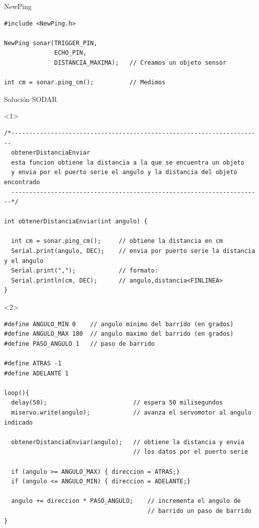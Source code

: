 \begin{frame}[fragile]{NewPing}
  \begin{lstlisting}
#include <NewPing.h>

NewPing sonar(TRIGGER_PIN,
              ECHO_PIN,
              DISTANCIA_MAXIMA);   // Creamos un objeto sensor

int cm = sonar.ping_cm();          // Medimos
  \end{lstlisting}
\end{frame}

\begin{frame}[fragile]{Solución SODAR}
  \begin{onlyenv}<1>
    \begin{lstlisting}
/*----------------------------------------------------------------------
  obtenerDistanciaEnviar
  esta funcion obtiene la distancia a la que se encuentra un objeto 
  y envia por el puerto serie el angulo y la distancia del objeto encontrado
  ----------------------------------------------------------------------*/
 
int obtenerDistanciaEnviar(int angulo) {
 
  int cm = sonar.ping_cm();     // obtiene la distancia en cm
  Serial.print(angulo, DEC);    // envia por puerto serie la distancia y el angulo
  Serial.print(",");            // formato:
  Serial.println(cm, DEC);      // angulo,distancia<FINLINEA>
}
    \end{lstlisting}
  \end{onlyenv}

  \begin{onlyenv}<2>
    \begin{lstlisting}
#define ANGULO_MIN 0    // angulo minimo del barrido (en grados)
#define ANGULO_MAX 180  // angulo maximo del barrido (en grados)
#define PASO_ANGULO 1   // paso de barrido 

#define ATRAS -1
#define ADELANTE 1

loop(){
  delay(50);                        // espera 50 milisegundos
  miservo.write(angulo);            // avanza el servomotor al angulo indicado

  obtenerDistanciaEnviar(angulo);   // obtiene la distancia y envia
                                    // los datos por el puerto serie

  if (angulo >= ANGULO_MAX) { direccion = ATRAS;}
  if (angulo <= ANGULO_MIN) { direccion = ADELANTE;}

  angulo += direccion * PASO_ANGULO;    // incrementa el angulo de 
                                        // barrido un paso de barrido
} 
    \end{lstlisting}
  \end{onlyenv}
\end{frame}


